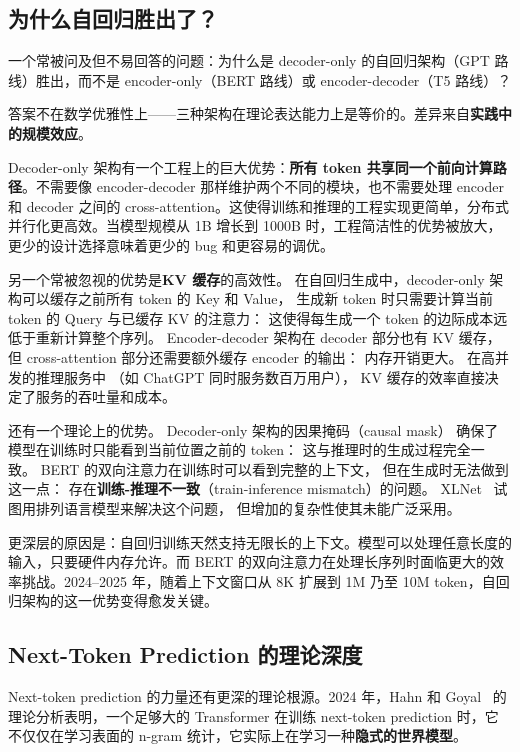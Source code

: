 \subsection{为什么自回归胜出了？}

一个常被问及但不易回答的问题：为什么是 decoder-only 的自回归架构（GPT 路线）胜出，而不是 encoder-only（BERT 路线）或 encoder-decoder（T5 路线）？

答案不在数学优雅性上——三种架构在理论表达能力上是等价的。差异来自\textbf{实践中的规模效应}。

Decoder-only 架构有一个工程上的巨大优势：\textbf{所有 token 共享同一个前向计算路径}。不需要像 encoder-decoder 那样维护两个不同的模块，也不需要处理 encoder 和 decoder 之间的 cross-attention。这使得训练和推理的工程实现更简单，分布式并行化更高效。当模型规模从 1B 增长到 1000B 时，工程简洁性的优势被放大，更少的设计选择意味着更少的 bug 和更容易的调优。

另一个常被忽视的优势是\textbf{KV 缓存}的高效性。
在自回归生成中，decoder-only 架构可以缓存之前所有 token 的 Key 和 Value，
生成新 token 时只需要计算当前 token 的 Query 与已缓存 KV 的注意力：
这使得每生成一个 token 的边际成本远低于重新计算整个序列。
Encoder-decoder 架构在 decoder 部分也有 KV 缓存，
但 cross-attention 部分还需要额外缓存 encoder 的输出：
内存开销更大。
在高并发的推理服务中
（如 ChatGPT 同时服务数百万用户），
KV 缓存的效率直接决定了服务的吞吐量和成本。

还有一个理论上的优势。
Decoder-only 架构的因果掩码（causal mask）
确保了模型在训练时只能看到当前位置之前的 token：
这与推理时的生成过程完全一致。
BERT 的双向注意力在训练时可以看到完整的上下文，
但在生成时无法做到这一点：
存在\textbf{训练-推理不一致}（train-inference mismatch）的问题。
XLNet~\cite{yang2019xlnet} 试图用排列语言模型来解决这个问题，
但增加的复杂性使其未能广泛采用。

更深层的原因是：自回归训练天然支持无限长的上下文。模型可以处理任意长度的输入，只要硬件内存允许。而 BERT 的双向注意力在处理长序列时面临更大的效率挑战。2024--2025 年，随着上下文窗口从 8K 扩展到 1M 乃至 10M token，自回归架构的这一优势变得愈发关键。

\subsection{Next-Token Prediction 的理论深度}

Next-token prediction 的力量还有更深的理论根源。2024 年，Hahn 和 Goyal~\cite{hahn2024theory} 的理论分析表明，一个足够大的 Transformer 在训练 next-token prediction 时，它不仅仅在学习表面的 n-gram 统计，它实际上在学习一种\textbf{隐式的世界模型}。


